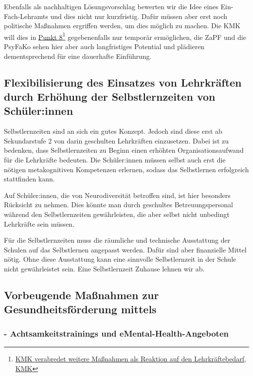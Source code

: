 \documentclass[DIV=calc]{scrartcl}
\begin{document}
Ebenfalls als nachhaltigen Lösungsvorschlag bewerten wir die Idee eines Ein-Fach-Lehramts und dies nicht nur kurzfristig. Dafür müssen aber erst noch politische Maßnahmen ergriffen werden, um dies möglich zu machen. Die KMK will dies in \href{https://www.kmk.org/aktuelles/artikelansicht/kmk-verabredet-weitere-massnahmen-als-reaktion-auf-den-lehrkraeftebedarf.html}{Punkt 8}\footnote{\href{https://www.kmk.org/aktuelles/artikelansicht/kmk-verabredet-weitere-massnahmen-als-reaktion-auf-den-lehrkraeftebedarf.html}{KMK verabredet weitere Maßnahmen als Reaktion auf den Lehrkräftebedarf, KMK}} 
gegebenenfalls nur temporär ermöglichen, die ZaPF und die PsyFaKo sehen hier aber auch langfristiges Potential und plädieren dementsprechend für eine dauerhafte Einführung.


\subsection*{Flexibilisierung des Einsatzes von Lehrkräften durch Erhöhung der Selbstlernzeiten von Schüler:innen}
Selbstlernzeiten sind an sich ein gutes Konzept. Jedoch sind diese erst ab Sekundarstufe 2 von darin geschulten Lehrkräften einzusetzen. Dabei ist zu bedenken, dass Selbstlernzeiten zu Beginn einen erhöhten Organisationsaufwand für die Lehrkräfte bedeuten. Die Schüler:innen müssen selbst auch erst die nötigen metakognitiven Kompetenzen erlernen, sodass das Selbstlernen erfolgreich stattfinden kann.

Auf Schüler:innen, die von Neurodiversität betroffen sind, ist hier besonders Rücksicht zu nehmen. Dies könnte man durch geschultes Betreuungspersonal während den Selbstlernzeiten gewährleisten, die aber selbst nicht unbedingt Lehrkräfte sein müssen.

Für die Selbstlernzeiten muss die räumliche und technische Ausstattung der Schulen auf das Selbstlernen angepasst werden. Dafür sind aber finanzielle Mittel nötig. Ohne diese Ausstattung kann eine sinnvolle Selbstlernzeit in der Schule nicht gewährleistet sein. Eine Selbstlernzeit Zuhause lehnen wir ab.

\subsection*{Vorbeugende Maßnahmen zur Gesundheitsförderung mittels}
\subsubsection*{- Achtsamkeitstrainings und eMental-Health-Angeboten}
\end{document}
